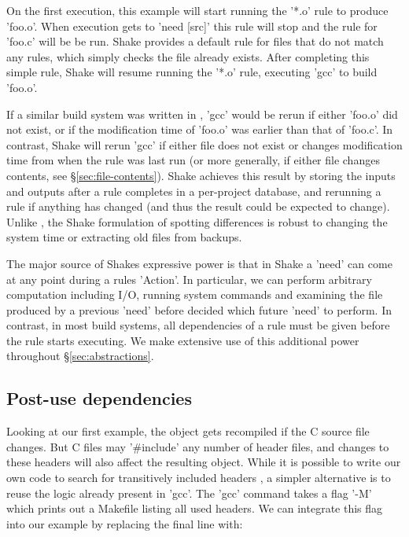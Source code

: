 On the first execution, this example will start running the \lst'*.o' rule to produce \lst'foo.o'. When execution gets to \lst'need [src]' this rule will stop and the rule for \lst'foo.c' will be be run. Shake provides a default rule for files that do not match any rules, which simply checks the file already exists. After completing this simple rule, Shake will resume running the \lst'*.o' rule, executing \lst'gcc' to build \lst'foo.o'.

If a similar build system was written in \make{}, \lst'gcc' would be rerun if either \lst'foo.o' did not exist, or if the modification time of \lst'foo.o' was earlier than that of \lst'foo.c'. In contrast, Shake will rerun \lst'gcc' if either file does not exist or changes modification time from when the rule was last run (or more generally, if either file changes contents, see \S\ref{sec:file-contents}). Shake achieves this result by storing the inputs and outputs after a rule completes in a per-project database, and rerunning a rule if anything has changed (and thus the result could be expected to change). Unlike \make{}, the Shake formulation of spotting differences is robust to changing the system time or extracting old files from backups.

The major source of Shakes expressive power is that in Shake a \lst'need' can come at any point during a rules \lst'Action'. In particular, we can perform arbitrary computation including I/O, running system commands and examining the file produced by a previous \lst'need' before decided which future \lst'need' to perform. In contrast, in most build systems, all dependencies of a rule must be given before the rule starts executing. We make extensive use of this additional power throughout \S\ref{sec:abstractions}.

\subsection{Post-use dependencies}

Looking at our first example, the object gets recompiled if the C source file changes. But C files may \lst'#include' any number of header files, and changes to these headers will also affect the resulting object. While it is possible to write our own code to search for transitively included headers \cite[\S6.4]{shake}, a simpler alternative is to reuse the logic already present in \lst'gcc'. The \lst'gcc' command takes a flag \lst'-M' which prints out a Makefile listing all used headers. We can integrate this flag into our example by replacing the final line with:

